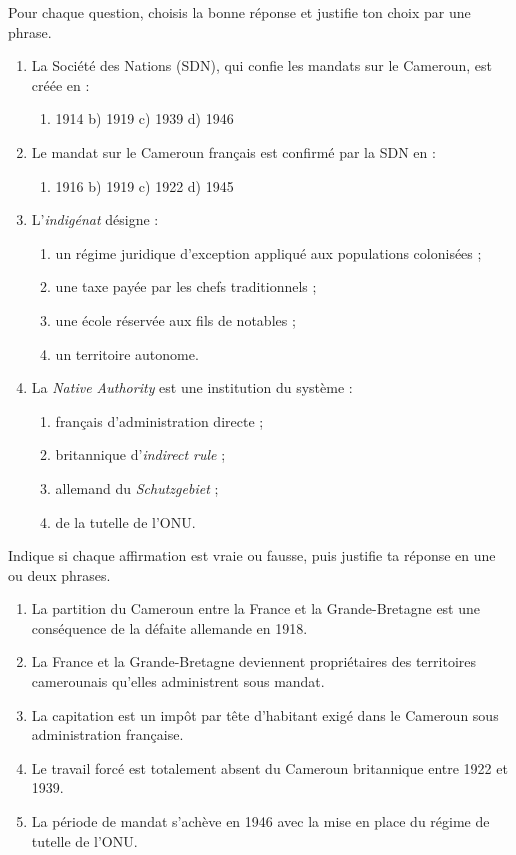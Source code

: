 \documentclass[11pt]{article}
\begin{document}
\begin{exercice}
Pour chaque question, choisis la bonne réponse et justifie ton choix par une phrase.
\begin{enumerate}
\item La Société des Nations (SDN), qui confie les mandats sur le Cameroun, est créée en :
\begin{enumerate}
\item 1914 \quad b) 1919 \quad c) 1939 \quad d) 1946
\end{enumerate}
\item Le mandat sur le Cameroun français est confirmé par la SDN en :
\begin{enumerate}
\item 1916 \quad b) 1919 \quad c) 1922 \quad d) 1945
\end{enumerate}
\item L'\emph{indigénat} désigne :
\begin{enumerate}
\item un régime juridique d'exception appliqué aux populations colonisées ;
\item une taxe payée par les chefs traditionnels ;
\item une école réservée aux fils de notables ;
\item un territoire autonome.
\end{enumerate}
\item La \emph{Native Authority} est une institution du système :
\begin{enumerate}
\item français d'administration directe ;
\item britannique d'\emph{indirect rule} ;
\item allemand du \emph{Schutzgebiet} ;
\item de la tutelle de l'ONU.
\end{enumerate}
\end{enumerate}
\end{exercice}

\begin{exercice}
Indique si chaque affirmation est vraie ou fausse, puis justifie ta réponse en une ou deux phrases.
\begin{enumerate}
\item La partition du Cameroun entre la France et la Grande-Bretagne est une conséquence de la défaite allemande en 1918.
\item La France et la Grande-Bretagne deviennent propriétaires des territoires camerounais qu'elles administrent sous mandat.
\item La capitation est un impôt par tête d'habitant exigé dans le Cameroun sous administration française.
\item Le travail forcé est totalement absent du Cameroun britannique entre 1922 et 1939.
\item La période de mandat s'achève en 1946 avec la mise en place du régime de tutelle de l'ONU.
\end{enumerate}
\end{exercice}
\end{document}
